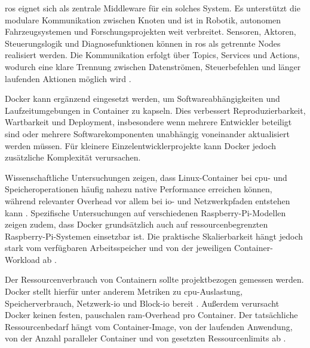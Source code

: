 \gls{ros} eignet sich als zentrale Middleware für ein solches System. Es unterstützt die modulare Kommunikation zwischen Knoten und ist in Robotik, autonomen Fahrzeugsystemen und Forschungsprojekten weit verbreitet. Sensoren, Aktoren, Steuerungslogik und Diagnosefunktionen können in \gls{ros} als getrennte Nodes realisiert werden. Die Kommunikation erfolgt über Topics, Services und Actions, wodurch eine klare Trennung zwischen Datenströmen, Steuerbefehlen und länger laufenden Aktionen möglich wird \cite{zotero-item-156}.

Docker kann ergänzend eingesetzt werden, um Softwareabhängigkeiten und Laufzeitumgebungen in Container zu kapseln. Dies verbessert Reproduzierbarkeit, Wartbarkeit und Deployment, insbesondere wenn mehrere Entwickler beteiligt sind oder mehrere Softwarekomponenten unabhängig voneinander aktualisiert werden müssen. Für kleinere Einzelentwicklerprojekte kann Docker jedoch zusätzliche Komplexität verursachen.

Wissenschaftliche Untersuchungen zeigen, dass Linux-Container bei \gls{cpu}- und Speicheroperationen häufig nahezu native Performance erreichen können, während relevanter Overhead vor allem bei \gls{io}- und Netzwerkpfaden entstehen kann \cite[Edition ``An Updated Performance Comparison of Virtual Machines and Linux Containers'']{instituteofelectricalandelectronicsengineers2015IEEEInternational2015}. Spezifische Untersuchungen auf verschiedenen Raspberry-Pi-Modellen zeigen zudem, dass Docker grundsätzlich auch auf ressourcenbegrenzten Raspberry-Pi-Systemen einsetzbar ist. Die praktische Skalierbarkeit hängt jedoch stark vom verfügbaren Arbeitsspeicher und von der jeweiligen Container-Workload ab \cite{gamessPerformanceEvaluationDocker2023}.

Der Ressourcenverbrauch von Containern sollte projektbezogen gemessen werden. Docker stellt hierfür unter anderem Metriken zu \gls{cpu}-Auslastung, Speicherverbrauch, Netzwerk-\gls{io} und Block-\gls{io} bereit \cite{zotero-item-163}. Außerdem verursacht Docker keinen festen, pauschalen \gls{ram}-Overhead pro Container. Der tatsächliche Ressourcenbedarf hängt vom Container-Image, von der laufenden Anwendung, von der Anzahl paralleler Container und von gesetzten Ressourcenlimits ab \cite{dockerinc.RuntimeMetrics}.

